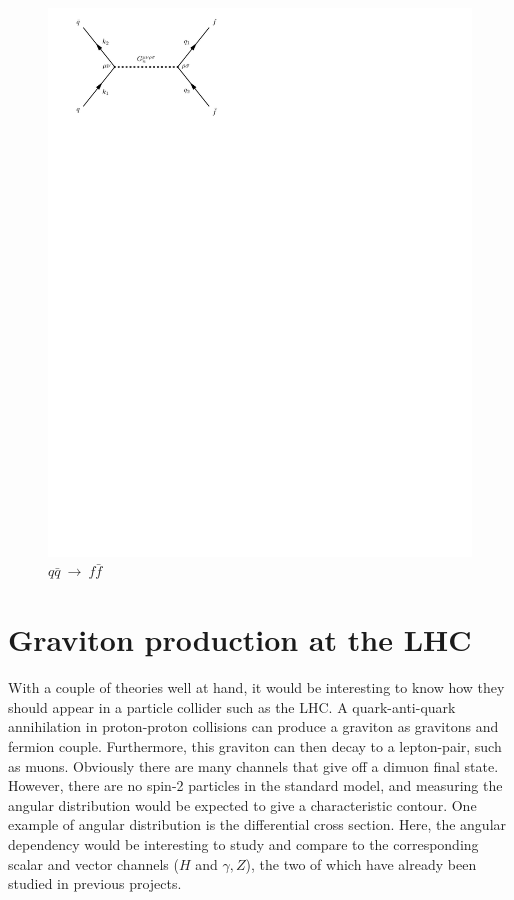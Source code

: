 \documentclass[11pt,a4paper]{article}
\begin{document}
\begin{figure}[H]
	\centering
	\includegraphics[trim={0.5cm 22cm 11.5cm 0cm},scale=1]{feynGraphs/qqbar_G_ffbar}
	\caption{$q\bar{q}\:\rightarrow\:f\bar{f}$}
	\label{fig:gravitonChannel}
\end{figure}

\section{Graviton production at the LHC}
With a couple of theories well at hand, it would be interesting to know how they should appear in a particle collider such as the LHC. A quark-anti-quark annihilation in proton-proton collisions can produce a graviton as gravitons and fermion couple. Furthermore, this graviton can then decay to a lepton-pair, such as muons. Obviously there are many channels that give off a dimuon final state. However, there are no spin-2 particles in the standard model, and measuring the angular distribution would be expected to give a characteristic contour. One example of angular distribution is the differential cross section. Here, the angular dependency would be interesting to study and compare to the corresponding scalar and vector channels ($H$ and $\gamma,Z$), the two of which have already been studied in previous projects.
\end{document}
